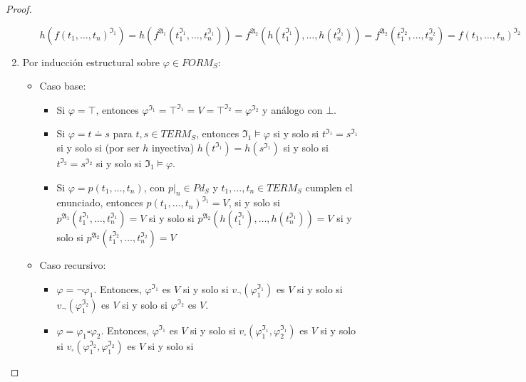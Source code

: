 \begin{proof}
\begin{enumerate}
\begin{itemize}
            $h(f(t_1, \dots, t_n)^{\mathfrak{I}_1}) = h(f^{\mathfrak{A}_1}(t_1^{\mathfrak{I}_1}, \dots, t_n^{\mathfrak{I}_1})) = f^{\mathfrak{A}_2}(h(t_1^{\mathfrak{I}_1}), \dots, h(t_n^{\mathfrak{I}_1})) =  f^{\mathfrak{A}_2}(t_1^{\mathfrak{I}_2}, \dots, t_n^{\mathfrak{I}_2}) = f(t_1, \dots, t_n)^{\mathfrak{I}_2}$
        \end{itemize}
    \item Por inducción estructural sobre $\varphi \in FORM_S$:
        \begin{itemize}
            \item Caso base:
                \begin{itemize}
                    \item Si $\varphi = \top$, entonces $\varphi^{\mathfrak{I}_1} = \top^{\mathfrak{I}_1} = V = \top^{\mathfrak{I}_2} = \varphi^{\mathfrak{I}_2}$ y análogo con $\bot$.
                    \item Si $\varphi = t \doteq s$ para $t, s \in TERM_S$, entonces $\mathfrak{I}_1 \vDash \varphi$ si y solo si $t^{\mathfrak{I}_1} = s^{\mathfrak{I}_1}$ si y solo si (por ser $h$ inyectiva) $h(t^{\mathfrak{I}_1}) = h(s^{\mathfrak{I}_1})$ si y solo si $t^{\mathfrak{I}_2} = s^{\mathfrak{I}_2}$ si y solo si  $\mathfrak{I}_1 \vDash \varphi$.
                    \item Si $\varphi = p(t_1, \dots, t_n)$, con $p|_n \in Pd_S$ y $t_1, \dots, t_n \in TERM_S$ cumplen el enunciado, entonces $p(t_1, \dots, t_n)^{\mathfrak{I}_1} = V$, si y solo si $p^{\mathfrak{A}_1}(t_1^{\mathfrak{I}_1}, \dots, t_n^{\mathfrak{I}_1}) = V$ si y solo si  $p^{\mathfrak{A}_2}(h(t_1^{\mathfrak{I}_1}), \dots, h(t_n^{\mathfrak{I}_1})) = V$ si y solo si  $p^{\mathfrak{A}_2}(t_1^{\mathfrak{I}_2}, \dots, t_n^{\mathfrak{I}_2}) = V$
                \end{itemize}
            \item Caso recursivo:
                \begin{itemize}
                    \item $\varphi=\neg\varphi_1$. Entonces, $\varphi^{\mathfrak{I}_1}$ es $V$ si y solo si $v_\neg(\varphi_1^{\mathfrak{I}_1})$ es $V$ si y solo si $v_\neg(\varphi_1^{\mathfrak{I}_2})$ es $V$ si y solo si 
                    $\varphi^{\mathfrak{I}_2}$ es $V$.
                    \item $\varphi=\varphi_1\square\varphi_2$. Entonces, 
                    $\varphi^{\mathfrak{I}_1}$ es $V$ si y solo si $v_\square(\varphi_1^{\mathfrak{I}_1},\varphi_2^{\mathfrak{I}_1})$ es $V$ si y solo si $v_\square(\varphi_1^{\mathfrak{I}_2},\varphi_1^{\mathfrak{I}_2})$ es $V$ si y solo si 

\end{itemize}
\end{itemize}
\end{enumerate}
\end{proof}
